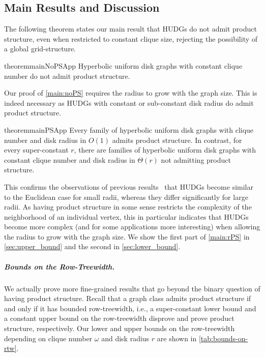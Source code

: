 \subsection{Main Results and Discussion}
%
The following theorem states our main result that HUDGs do not admit product structure, even when restricted to constant clique size, rejecting the possibility of a global grid-structure. 
%
\begin{restatable}{theorem}{mainNoPSApp}\label{main:noPS}
    Hyperbolic uniform disk graphs with constant clique number do not admit product structure.
\end{restatable}
%
Our proof of \cref{main:noPS} requires the radius to grow with the graph size.
This is indeed necessary as HUDGs with constant or sub-constant disk radius do admit product structure.
%
\begin{restatable}{theorem}{mainPSApp}\label{main:rPS}
    Every family of hyperbolic uniform disk graphs with clique number and disk radius in $ O(1) $ admits product structure.
    In contrast, for every super-constant $ r $, there are families of hyperbolic uniform disk graphs with constant clique number and disk radius in  $ \Theta(r) $ not admitting product structure.
\end{restatable}%
%
This confirms the observations of previous results~\cite{Struc_Indep_Hyper_Unifor_Disk_Graph-Blaesius25,blasius_strongly_2023} that HUDGs become similar to the Euclidean case for small radii, whereas they differ significantly for large radii.
As having product structure in some sense restricts the complexity of the neighborhood of an individual vertex, this in particular indicates that HUDGs become more complex (and for some applications more interesting) when allowing the radius to grow with the graph size.
We show the first part of \cref{main:rPS} in \cref{sec:upper_bound} and the second in \cref{sec:lower_bound}.
%
\subparagraph{Bounds on the Row-Treewidth.}
%
We actually prove more fine-grained results that go beyond the binary question of having product structure.
Recall that a graph class admits product structure if and only if it has bounded row-treewidth, i.e., a super-constant lower bound and a constant upper bound on the row-treewidth disprove and prove product structure, respectively.
%
Our lower and upper bounds on the row-treewidth depending on clique number $\omega$ and disk radius $r$ are shown in \cref{tab:bounds-on-rtw}.
